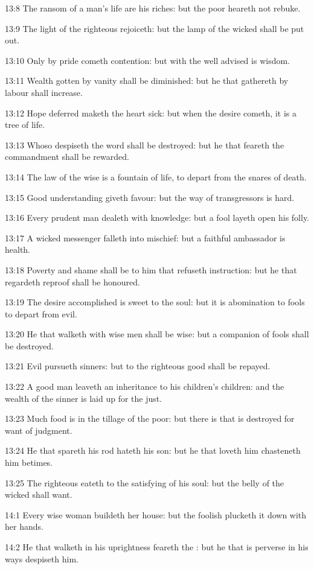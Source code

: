 13:8 The ransom of a man's life are his riches: but the poor heareth not rebuke.

13:9 The light of the righteous rejoiceth: but the lamp of the wicked shall be put out.

13:10 Only by pride cometh contention: but with the well advised is wisdom.

13:11 Wealth gotten by vanity shall be diminished: but he that gathereth by labour shall increase.

13:12 Hope deferred maketh the heart sick: but when the desire cometh, it is a tree of life.

13:13 Whoso despiseth the word shall be destroyed: but he that feareth the commandment shall be rewarded.

13:14 The law of the wise is a fountain of life, to depart from the snares of death.

13:15 Good understanding giveth favour: but the way of transgressors is hard.

13:16 Every prudent man dealeth with knowledge: but a fool layeth open his folly.

13:17 A wicked messenger falleth into mischief: but a faithful ambassador is health.

13:18 Poverty and shame shall be to him that refuseth instruction: but he that regardeth reproof shall be honoured.

13:19 The desire accomplished is sweet to the soul: but it is abomination to fools to depart from evil.

13:20 He that walketh with wise men shall be wise: but a companion of fools shall be destroyed.

13:21 Evil pursueth sinners: but to the righteous good shall be repayed.

13:22 A good man leaveth an inheritance to his children's children: and the wealth of the sinner is laid up for the just.

13:23 Much food is in the tillage of the poor: but there is that is destroyed for want of judgment.

13:24 He that spareth his rod hateth his son: but he that loveth him chasteneth him betimes.

13:25 The righteous eateth to the satisfying of his soul: but the belly of the wicked shall want.

14:1 Every wise woman buildeth her house: but the foolish plucketh it down with her hands.

14:2 He that walketh in his uprightness feareth the \LORD: but he that is perverse in his ways despiseth him.


